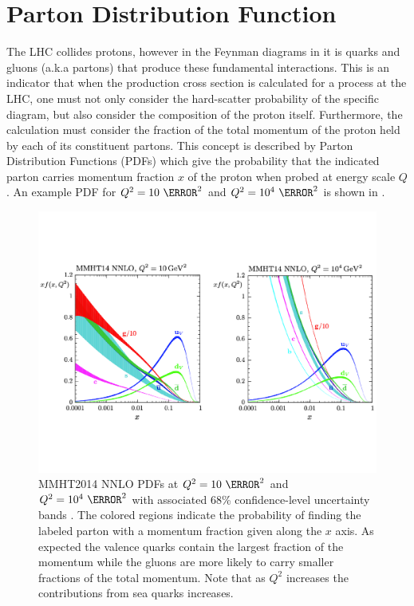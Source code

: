 \section{Parton Distribution Function} \label{sec:higgs:partons}

The LHC collides protons, however in the Feynman diagrams in
 it is quarks and gluons (a.k.a partons) that
produce these fundamental interactions. This is an indicator that when the
production cross section is calculated for a process at the LHC, one must not
only consider the hard-scatter probability of the specific diagram, but also
consider the composition of the proton itself.  Furthermore, the calculation
must consider the fraction of the total momentum of the proton held by each of
its constituent partons.  This concept is described by Parton Distribution
Functions (PDFs) which give the probability that the indicated parton carries
momentum fraction $x$ of the proton when probed at energy scale $Q$.  An
example PDF for $Q^2 = 10~\GeV^2$ and $Q^2 = 10^{4}~\GeV^2$ is shown in
.

\begin{figure}[!htbp]
  \begin{center}
    \includegraphics[width=0.8\linewidth]{figures/higgs/pdf.pdf}
    \caption{MMHT2014 NNLO PDFs at $Q^2 = 10~\GeV^{2}$ and $Q^2
=10^{4}~\GeV^{2}$ with associated 68\% confidence-level uncertainty bands
\cite{Harland-Lang2015}.  The colored regions indicate the probability of
finding the labeled parton with a momentum fraction given along the $x$ axis.
As expected the valence quarks contain the largest fraction of the momentum
while the gluons are more likely to carry smaller fractions of the total
momentum.  Note that as $Q^2$ increases the contributions from sea quarks
increases.}
    \label{fig:parton_distribution_function}
  \end{center}
\end{figure}
